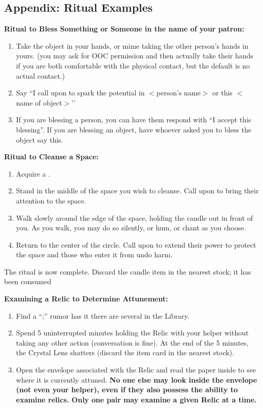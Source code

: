 \documentclass[green]{GL2020}
\begin{document}
\subsection*{Appendix: Ritual Examples}

\textbf{Ritual to Bless Something or Someone in the name of your patron:}
  \begin{enumerate}
    \item Take the object in your hands, or mime taking the other person’s hands in yours. (you may ask for OOC permission and then actually take their hands if you are both comfortable with the physical contact, but the default is no actual contact.)
    \item Say ``I call upon \cTechGod{} to spark the potential in $<$person’s name$>$ or this $<$ name of object$>$’’
    \item If you are blessing a person, you can have them respond with ``I accept this blessing''. If you are blessing an object, have whoever asked you to bless the object say this.
  \end{enumerate}

\textbf{Ritual to Cleanse a Space:}
  \begin{enumerate}
    \item Acquire a \iRitualCandle{}.
    \item Stand in the middle of the space you wish to cleanse. Call upon \cFarmGod{} to bring their attention to the space.
    \item Walk slowly around the edge of the space, holding the candle out in front of you. As you walk, you may do so silently, or hum, or chant as you choose.
    \item Return to the center of the circle. Call upon \cTechGod{} to extend their power to protect the space and those who enter it from undo harm.
  \end{enumerate}
The ritual is now complete. Discard the candle item in the nearest stock; it has been consumed
   
\textbf{Examining a Relic to Determine Attunement:}
  \begin{enumerate}
    \item Find a ``\iCrystalLens{};'' rumor has it there are several in the Library. 
    \item Spend 5 uninterrupted minutes holding the Relic with your helper without taking any other action (conversation is fine). At the end of the 5 minutes, the Crystal Lens shatters (discard the item card in the nearest stock). 
    \item Open the envelope associated with the Relic and read the paper inside to see where it is currently attuned. \textbf{No one else may look inside the envelope (not even your helper), even if they also possess the ability to examine relics. Only one pair may examine a given Relic at a time.}
  \end{enumerate}
   
\end{document}
